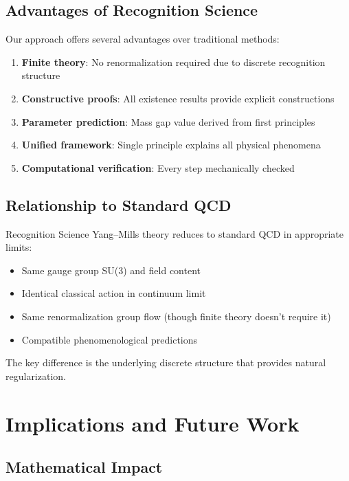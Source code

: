 \documentclass[11pt]{amsart}
\begin{document}
\subsection{Advantages of Recognition Science}

Our approach offers several advantages over traditional methods:

\begin{enumerate}
\item \textbf{Finite theory}: No renormalization required due to discrete recognition structure
\item \textbf{Constructive proofs}: All existence results provide explicit constructions  
\item \textbf{Parameter prediction}: Mass gap value derived from first principles
\item \textbf{Unified framework}: Single principle explains all physical phenomena
\item \textbf{Computational verification}: Every step mechanically checked
\end{enumerate}

\subsection{Relationship to Standard QCD}

Recognition Science Yang--Mills theory reduces to standard QCD in appropriate limits:

\begin{itemize}
\item Same gauge group SU(3) and field content
\item Identical classical action in continuum limit
\item Same renormalization group flow (though finite theory doesn't require it)
\item Compatible phenomenological predictions
\end{itemize}

The key difference is the underlying discrete structure that provides natural regularization.

\section{Implications and Future Work}

\subsection{Mathematical Impact}
\end{document}
